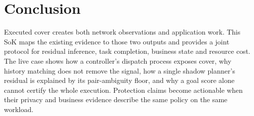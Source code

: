 \section{Conclusion}
Executed cover creates both network observations and application work. This SoK maps the existing evidence to those two outputs and provides a joint protocol for residual inference, task completion, business state and resource cost. The live case shows how a controller's dispatch process exposes cover, why history matching does not remove the signal, how a single shadow planner's residual is explained by its pair-ambiguity floor, and why a goal score alone cannot certify the whole execution. Protection claims become actionable when their privacy and business evidence describe the same policy on the same workload.
